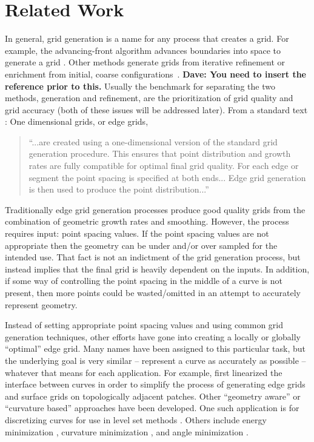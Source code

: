 \section{Related Work}
In general, grid generation is a name for any process that creates a grid.  
For example, the advancing-front algorithm advances boundaries into space 
to generate a grid \cite{lohner88}.  Other methods generate grids from 
iterative refinement or enrichment from initial, coarse 
configurations~\cite{REFERENCE}.  {\bf{Dave:  You need to insert the 
reference prior to this.}}  Usually the benchmark for separating the two 
methods, generation and refinement, are the prioritization of grid quality and grid accuracy (both of these issues will be addressed later).  From a standard text \cite{thompson98}: One dimensional grids, or edge grids, 

\begin{quotation}
\noindent ``...are created using a one-dimensional version of the standard grid generation procedure.  This ensures that point distribution and growth rates are fully compatible for optimal final grid quality.  For each edge or segment the point spacing is specified at both ends... Edge grid generation is then used to produce the point distribution...''
\end{quotation} 

\noindent Traditionally edge grid generation processes produce good quality grids from the combination of geometric growth rates and smoothing.  However, the process requires input: point spacing values.  If the point spacing values are not appropriate then the geometry can be under and/or over sampled for the intended use.  That fact is not an indictment of the grid generation process, but instead implies that the final grid is heavily dependent on the inputs.  In addition, if some way of controlling the point spacing in the middle of a curve is not present, then more points could be wasted/omitted in an attempt to accurately represent geometry.

Instead of setting appropriate point spacing values and using common grid generation techniques, other efforts have gone into creating a locally or globally ``optimal'' edge grid.  Many names have been assigned to this particular task, but the underlying goal is very similar -- represent a curve as accurately as possible -- whatever that means for each application.  For example, \cite{laug04} first linearized the interface between curves in order to simplify the process of generating edge grids and surface grids on topologically adjacent patches.  Other ``geometry aware'' or ``curvature based'' approaches have been developed.  One such application is for discretizing curves for use in level set methods \cite{macklin06}.  Others include energy minimization \cite{hofer04}, curvature minimization \cite{zehiry10}, and angle minimization \cite{ebeida10}.

